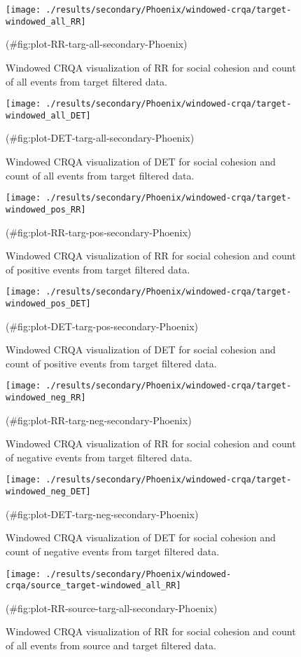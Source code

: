 \begin{appendix}
\begin{figure}[H]
\texttt{[image: ./results/secondary/Phoenix/windowed-crqa/target-windowed\_all\_RR]} \caption{Windowed CRQA visualization of RR for social cohesion and count of all events from target filtered data.}(\#fig:plot-RR-targ-all-secondary-Phoenix)
\end{figure}
\begin{figure}[H]
\texttt{[image: ./results/secondary/Phoenix/windowed-crqa/target-windowed\_all\_DET]} \caption{Windowed CRQA visualization of DET for social cohesion and count of all events from target filtered data.}(\#fig:plot-DET-targ-all-secondary-Phoenix)
\end{figure}
\begin{figure}[H]
\texttt{[image: ./results/secondary/Phoenix/windowed-crqa/target-windowed\_pos\_RR]} \caption{Windowed CRQA visualization of RR for social cohesion and count of positive events from target filtered data.}(\#fig:plot-RR-targ-pos-secondary-Phoenix)
\end{figure}
\begin{figure}[H]
\texttt{[image: ./results/secondary/Phoenix/windowed-crqa/target-windowed\_pos\_DET]} \caption{Windowed CRQA visualization of DET for social cohesion and count of positive events from target filtered data.}(\#fig:plot-DET-targ-pos-secondary-Phoenix)
\end{figure}
\begin{figure}[H]
\texttt{[image: ./results/secondary/Phoenix/windowed-crqa/target-windowed\_neg\_RR]} \caption{Windowed CRQA visualization of RR for social cohesion and count of negative events from target filtered data.}(\#fig:plot-RR-targ-neg-secondary-Phoenix)
\end{figure}
\begin{figure}[H]
\texttt{[image: ./results/secondary/Phoenix/windowed-crqa/target-windowed\_neg\_DET]} \caption{Windowed CRQA visualization of DET for social cohesion and count of negative events from target filtered data.}(\#fig:plot-DET-targ-neg-secondary-Phoenix)
\end{figure}
\begin{figure}[H]
\texttt{[image: ./results/secondary/Phoenix/windowed-crqa/source\_target-windowed\_all\_RR]} \caption{Windowed CRQA visualization of RR for social cohesion and count of all events from source and target filtered data.}(\#fig:plot-RR-source-targ-all-secondary-Phoenix)

\end{figure}
\end{appendix}
